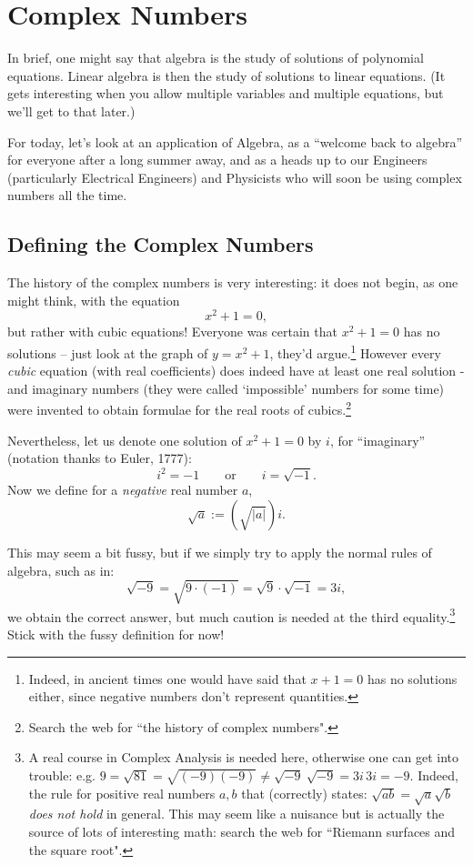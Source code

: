 

\chapter{Complex Numbers}
\label{Chapter:01complex}


 
In brief, one might say that algebra is the study of solutions of polynomial equations.
Linear algebra is then the study of solutions to linear equations.  (It
gets interesting when you allow multiple variables and multiple equations,
but we'll get to that later.)

For today, let's look at an application of Algebra, as a ``welcome back to
algebra'' for everyone after a long summer away, and as a heads up to
our Engineers (particularly Electrical Engineers) and Physicists 
who will soon be using
complex numbers all the time.



\section{Defining the Complex Numbers}

The history of the complex numbers is very interesting: it does not begin, as one might think, with the equation
$$
x^2 + 1 = 0,
$$ but rather with cubic equations!
Everyone was certain that $
x^2 + 1 = 0
$ has no solutions --  just look at the graph of $y=x^2+1$, they'd argue.\footnote{Indeed, in ancient times one would have said that
$x+1=0$ has no solutions either, since negative numbers don't
represent quantities.} However every \emph{cubic} equation (with real coefficients) does indeed have at least  one real solution - and imaginary numbers (they were called `impossible' numbers for some time) were invented to obtain formulae for the real roots of cubics.\footnote{Search the web for ``the history of complex numbers".} 

 
Nevertheless, let us denote one solution of $
x^2 + 1 = 0
$ by $i$, for ``imaginary'' (notation thanks to Euler, 1777):
$$
i^2 = -1 \qquad \text{or} \qquad i = \sqrt{-1}.
$$
Now we define for a \emph{negative} real number $a$, 
$$\sqrt{a}:=(\sqrt{\vert a\vert}) i.$$

This may seem a bit fussy, but if we simply try to apply the normal rules of algebra, such as in: 
$$
\sqrt{-9} = \sqrt{9 \cdot (-1)} = \sqrt{9} \cdot \sqrt{-1} = 3i,
$$  we obtain the correct answer, but much caution is needed at the third equality.\footnote{A real course in Complex Analysis is needed here, otherwise one can get into trouble: e.g. $9=\sqrt{81}=\sqrt{(-9)(-9)}\not=\sqrt{ -9 }\ \sqrt{ -9 }=3i\, 3i =-9$. Indeed,  the rule for positive real numbers $a,b$ that (correctly) states: $\sqrt{ab}=\sqrt{a}\sqrt{b}$ \emph{does not hold} in general. This may seem like a nuisance but is actually the source of lots of interesting math: search the web for ``Riemann surfaces and the square root".} Stick with the fussy definition for now!
 
